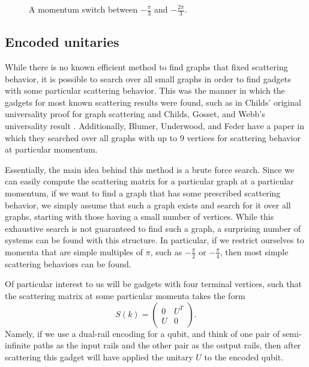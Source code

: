 \documentclass[../thesis-main/thesis-main]{subfiles}
\begin{document}
\begin{figure}
  \centering
  
  \caption{A momentum switch between $-\frac{\pi}{3}$ and $-\frac{2\pi}{3}$.}
  \label{fig:mom_switch_ex}
\end{figure}


\subsection{Encoded unitaries}\label{sec:gadgets_unitary}

While there is no known efficient method to find graphs that fixed scattering behavior, it is possible to search over all small graphs in order to find gadgets with some particular scattering behavior.  This was the manner in which the gadgets for most known scattering results were found, such as in Childs' original universality proof for graph scattering \cite{Chi09} and Childs, Gosset, and Webb's universality result \cite{MPQW}.  Additionally, Blumer, Underwood, and Feder have a paper \cite{BUF11} in which they searched over all graphs with up to 9 vertices for scattering behavior at particular momentum.

Essentially, the main idea behind this method is a brute force search.  Since we can easily compute the scattering matrix for a particular graph at a particular momentum, if we want to find a graph that has some prescribed scattering behavior, we simply assume that such a graph exists and search for it over all graphs, starting with those having a small number of vertices.  While this exhaustive search is not guaranteed to find such a graph, a surprising number of systems can be found with this structure.  In particular, if we restrict ourselves to momenta that are simple multiples of $\pi$, such as $-\frac{\pi}{2}$ or $-\frac{\pi}{4}$, then most simple scattering behaviors can be found.  

Of particular interest to us will be gadgets with four terminal vertices, such that the scattering matrix at some particular momenta takes the form
\begin{equation}
  S(k) = \begin{pmatrix} 0 & U^T\\
    U & 0\end{pmatrix}. \label{eq:encoded_scat}
\end{equation}
Namely, if we use a dual-rail encoding for a qubit, and think of one pair of semi-infinite paths as the input rails and the other pair as the output rails, then after scattering this gadget will have applied the unitary $U$ to the encoded qubit.
\end{document}
